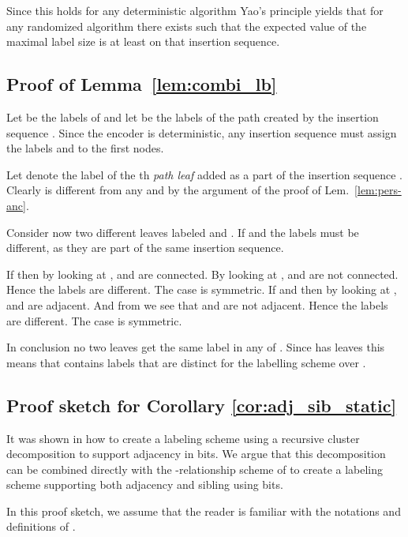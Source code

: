 \documentclass{llncs}
\begin{document}
Since this holds for any deterministic algorithm Yao's principle yields that
for any randomized algorithm there exists  such that the
expected value of the maximal label size is at least  on that
insertion sequence.

\subsection{Proof of Lemma~\ref{lem:combi_lb}} \label{Lemma-combi-bi}
    Let  be the labels of  and let  be the labels of the path created by the insertion sequence
    . Since the encoder is deterministic, any insertion sequence
     must assign the labels 
    and  to the first  nodes.

    Let  denote the label of the th \emph{path leaf} added as a
    part of the insertion sequence . Clearly
     is different from any  and  by the
    argument of the proof of Lem.~\ref{lem:pers-anc}.

    Consider now two different leaves labeled  and .
    If  and  the labels must be different, as they are part of the
    same insertion sequence.

    If  then by looking at ,  and  are connected.
    By looking at ,  and  are not connected. Hence
    the labels are different. The case  is symmetric.
    If  and  then by looking at ,  and 
    are adjacent. And from  we see that  and  are
    not adjacent. Hence the labels are different. The case  is symmetric.

    In conclusion no two leaves get the same label in any of .	Since 
    has  leaves this means that  contains  labels that are distinct
    for the labelling scheme over .



\subsection{Proof sketch for Corollary \ref{cor:adj_sib_static}}
\label{app:adj_sib}

It was shown in \cite{Alstrup02} how to create a labeling scheme
using a recursive cluster decomposition to support adjacency in  bits. We argue that this decomposition can be combined directly
with the -relationship scheme of \cite{Alstrup05} to create a labeling
scheme supporting both adjacency and sibling using  bits.

In this proof sketch, we assume that the reader is
familiar with the notations and definitions of \cite{Alstrup02,Alstrup05}.
\end{document}
